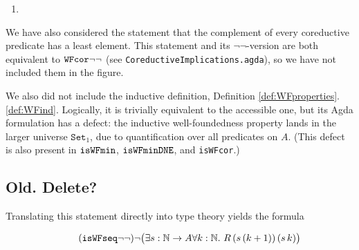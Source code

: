 \begin{enumerate}
  \item {}

\end{enumerate}

We have also considered the statement that the complement of every coreductive predicate
  has a least element.  This statement and its $\lnot\lnot$-version are both equivalent to $\mathtt{WFcor}{\lnot\lnot}$
  (see \texttt{CoreductiveImplications.agda}), so we have not included them in the figure.

We also did not include the inductive definition, Definition \ref{def:WFproperties}.\ref{def:WFind}.
  Logically, it is trivially equivalent to the accessible one, but its Agda formulation has a defect:
  the inductive well-foundedness property lands in the larger universe $\mathtt{Set}_1$, due to
  quantification over all predicates on $A$.  (This defect is also present in $\mathtt{isWFmin}$, $\mathtt{isWFminDNE}$, and \texttt{isWFcor}.)


\subsection{Old. Delete?}

Translating this statement directly into type theory yields the formula

\[\tag{$\isWFseqm$} \lnot \big(\exists s : \nat \to A \forall k : \nat. \  R \,(s\,(k+1)) \, (s\, k) \big) \]

